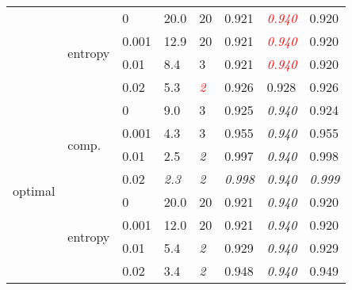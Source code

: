 \begin{table}[h]
\begin{tabularx}{\textwidth}{|X|X|X|X|X|X|X|X|}
		& \multirow{4}{*}{entropy} & 0         & 20.0          & 20               & 0.921          & \textcolor{red}{\textit{0.940}} & 0.920          \\ \cline{3-8} 
		&                          & 0.001     & 12.9          & 20               & 0.921          & \textcolor{red}{\textit{0.940}} & 0.920          \\ \cline{3-8} 
		&                          & 0.01      & 8.4           & 3                & 0.921          & \textcolor{red}{\textit{0.940}} & 0.920          \\ \cline{3-8} 
		&                          & 0.02      & 5.3           & \textcolor{red}{\textit{2}} & 0.926          & 0.928                & 0.926          \\ \hline
		\multirow{8}{*}{optimal} & \multirow{4}{*}{comp.}   & 0         & 9.0           & 3                & 0.925          & \textit{0.940}       & 0.924          \\ \cline{3-8} 
		&                          & 0.001     & 4.3           & 3                & 0.955          & \textit{0.940}       & 0.955          \\ \cline{3-8} 
		&                          & 0.01      & 2.5           & \textit{2}       & 0.997          & \textit{0.940}       & 0.998          \\ \cline{3-8} 
		&                          & 0.02      & \textit{2.3}  & \textit{2}       & \textit{0.998} & \textit{0.940}       & \textit{0.999} \\ \cline{2-8} 
		& \multirow{4}{*}{entropy} & 0         & 20.0          & 20               & 0.921          & \textit{0.940}       & 0.920          \\ \cline{3-8} 
		&                          & 0.001     & 12.0          & 20               & 0.921          & \textit{0.940}       & 0.920          \\ \cline{3-8} 
		&                          & 0.01      & 5.4           & \textit{2}       & 0.929          & \textit{0.940}       & 0.929          \\ \cline{3-8} 
		&                          & 0.02      & 3.4           & \textit{2}       & 0.948          & \textit{0.940}       & 0.949          \\ \hline 
	\end{tabularx}
\end{table}








